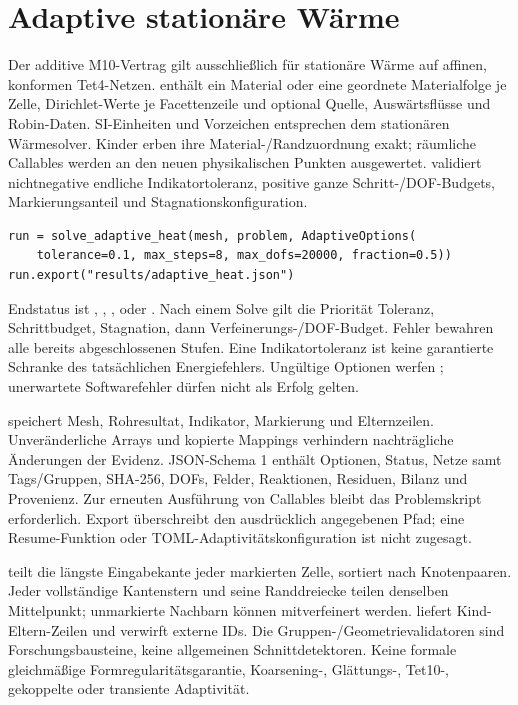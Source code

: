 \chapter{Adaptive stationäre Wärme}\label{api:adaptive}
Der additive M10-Vertrag gilt ausschließlich für stationäre Wärme auf affinen,
konformen Tet4-Netzen.  enthält ein Material oder eine geordnete
Materialfolge je Zelle, Dirichlet-Werte je Facettenzeile und optional Quelle,
Auswärtsflüsse und Robin-Daten. SI-Einheiten und Vorzeichen entsprechen dem
stationären Wärmesolver. Kinder erben ihre Material-/Randzuordnung exakt;
räumliche Callables werden an den neuen physikalischen Punkten ausgewertet.
 validiert nichtnegative endliche Indikatortoleranz,
positive ganze Schritt-/DOF-Budgets, Markierungsanteil und Stagnationskonfiguration.
\begin{lstlisting}
run = solve_adaptive_heat(mesh, problem, AdaptiveOptions(
    tolerance=0.1, max_steps=8, max_dofs=20000, fraction=0.5))
run.export("results/adaptive_heat.json")
\end{lstlisting}
Endstatus ist , , ,
 oder . Nach einem Solve gilt die Priorität Toleranz,
Schrittbudget, Stagnation, dann Verfeinerungs-/DOF-Budget. Fehler bewahren alle
bereits abgeschlossenen Stufen. Eine Indikatortoleranz ist keine garantierte
Schranke des tatsächlichen Energiefehlers. Ungültige Optionen werfen
; unerwartete Softwarefehler dürfen nicht als Erfolg gelten.

 speichert Mesh, Rohresultat, Indikator, Markierung und
Elternzeilen. Unveränderliche Arrays und kopierte Mappings verhindern nachträgliche
Änderungen der Evidenz. JSON-Schema 1 enthält Optionen, Status, Netze samt
Tags/Gruppen, SHA-256, DOFs, Felder, Reaktionen, Residuen, Bilanz und Provenienz.
Zur erneuten Ausführung von Callables bleibt das Problemskript erforderlich.
Export überschreibt den ausdrücklich angegebenen Pfad; eine Resume-Funktion
oder TOML-Adaptivitätskonfiguration ist nicht zugesagt.

 teilt die längste Eingabekante jeder markierten Zelle,
sortiert nach Knotenpaaren. Jeder vollständige Kantenstern und seine Randdreiecke
teilen denselben Mittelpunkt; unmarkierte Nachbarn können mitverfeinert werden.
 liefert Kind-Eltern-Zeilen und verwirft externe IDs.
Die Gruppen-/Geometrievalidatoren sind Forschungsbausteine, keine allgemeinen
Schnittdetektoren. Keine formale gleichmäßige Formregularitätsgarantie,
Koarsening-, Glättungs-, Tet10-, gekoppelte oder transiente Adaptivität.

